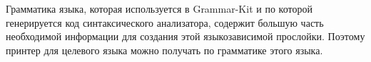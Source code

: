 Грамматика языка, которая используется в Grammar-Kit и по которой генерируется код синтаксического анализатора, содержит большую часть необходимой информации для создания этой языкозависимой прослойки.
Поэтому принтер для целевого языка можно получать по грамматике этого языка.







